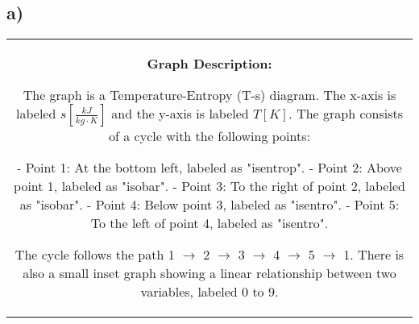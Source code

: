 

\subsection*{a)}

\begin{center}
\begin{tabular}{c}
\begin{minipage}{0.5\textwidth}
\begin{center}
\textbf{Graph Description:}
\end{center}
The graph is a Temperature-Entropy (T-s) diagram. The x-axis is labeled $s \left[ \frac{kJ}{kg \cdot K} \right]$ and the y-axis is labeled $T \left[ K \right]$. The graph consists of a cycle with the following points:

- Point 1: At the bottom left, labeled as "isentrop".
- Point 2: Above point 1, labeled as "isobar".
- Point 3: To the right of point 2, labeled as "isobar".
- Point 4: Below point 3, labeled as "isentro".
- Point 5: To the left of point 4, labeled as "isentro".

The cycle follows the path 1 $\rightarrow$ 2 $\rightarrow$ 3 $\rightarrow$ 4 $\rightarrow$ 5 $\rightarrow$ 1. There is also a small inset graph showing a linear relationship between two variables, labeled 0 to 9.
\end{minipage}
\end{tabular}
\end{center}